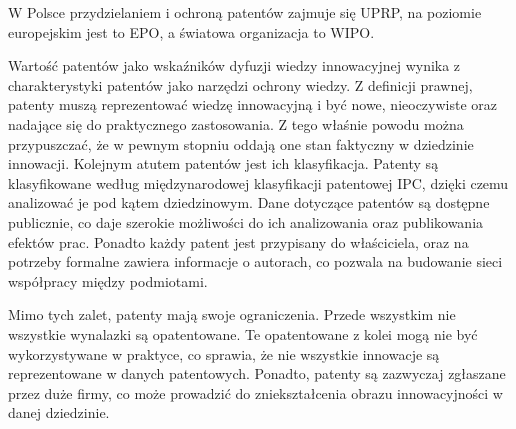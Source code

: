 W Polsce przydzielaniem i ochroną patentów zajmuje się \ac{UPRP}, 
na poziomie europejskim jest to \ac{EPO}, a światowa organizacja 
to \ac{WIPO}.

Wartość patentów jako wskaźników dyfuzji wiedzy innowacyjnej
wynika z charakterystyki patentów jako narzędzi ochrony wiedzy.
Z definicji prawnej, patenty muszą reprezentować wiedzę innowacyjną
i być nowe, nieoczywiste oraz nadające się do praktycznego
zastosowania. Z tego właśnie powodu można przypuszczać, że
w pewnym stopniu oddają one stan faktyczny w dziedzinie innowacji.
Kolejnym atutem patentów jest ich klasyfikacja.
Patenty są klasyfikowane według międzynarodowej klasyfikacji
patentowej \ac{IPC}, dzięki czemu analizować je pod kątem dziedzinowym.
Dane dotyczące patentów są dostępne publicznie, co daje 
szerokie możliwości do ich analizowania oraz publikowania efektów
prac. Ponadto każdy patent jest przypisany do właściciela, oraz
na potrzeby formalne zawiera informacje o autorach, co pozwala
na budowanie sieci współpracy między podmiotami.

Mimo tych zalet, patenty mają swoje ograniczenia. Przede wszystkim
nie wszystkie wynalazki są opatentowane. Te opatentowane z kolei
mogą nie być wykorzystywane w praktyce, co sprawia, że nie
wszystkie innowacje są reprezentowane w danych patentowych.
Ponadto, patenty są zazwyczaj zgłaszane przez duże firmy, co
może prowadzić do zniekształcenia obrazu innowacyjności w
danej dziedzinie.